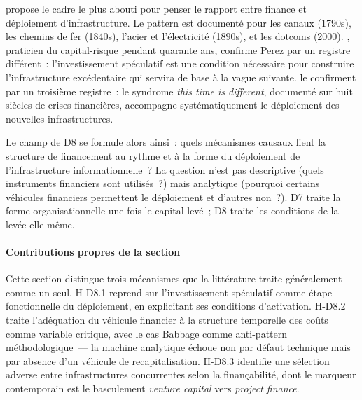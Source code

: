 \markEVO \textcite{perez_technological_2002} propose le cadre le plus abouti pour penser le rapport entre finance et déploiement d'infrastructure.  Le pattern est documenté pour les canaux (1790s), les chemins de fer (1840s), l'acier et l'électricité (1890s), et les dotcoms (2000). \textcite{janeway_doing_2012}, praticien du capital-risque pendant quarante ans, confirme Perez par un registre différent~: l'investissement spéculatif est une condition nécessaire pour construire l'infrastructure excédentaire qui servira de base à la vague suivante. \textcite{reinhart_this_2009} le confirment par un troisième registre~: le syndrome \og \emph{this time is different}\fg{}, documenté sur huit siècles de crises financières, accompagne systématiquement le déploiement des nouvelles infrastructures.

Le champ de D8 se formule alors ainsi~: quels mécanismes causaux lient la structure de financement au rythme et à la forme du déploiement de l'infrastructure informationnelle~? La question n'est pas descriptive (quels instruments financiers sont utilisés~?) mais analytique (pourquoi certains véhicules financiers permettent le déploiement et d'autres non~?). D7 traite la forme organisationnelle une fois le capital levé~; D8 traite les conditions de la levée elle-même.

\paragraph{Contributions propres de la section}
Cette section distingue trois mécanismes que la littérature traite généralement comme un seul. H-D8.1 reprend \textcite{perez_technological_2002} sur l'investissement spéculatif comme étape fonctionnelle du déploiement, en explicitant ses conditions d'activation. H-D8.2 traite l'adéquation du véhicule financier à la structure temporelle des coûts comme variable critique, avec le cas Babbage comme anti-pattern méthodologique~--- la machine analytique échoue non par défaut technique mais par absence d'un véhicule de recapitalisation. H-D8.3 identifie une sélection adverse entre infrastructures concurrentes selon la finançabilité, dont le marqueur contemporain est le basculement \emph{venture capital} vers \emph{project finance}.


